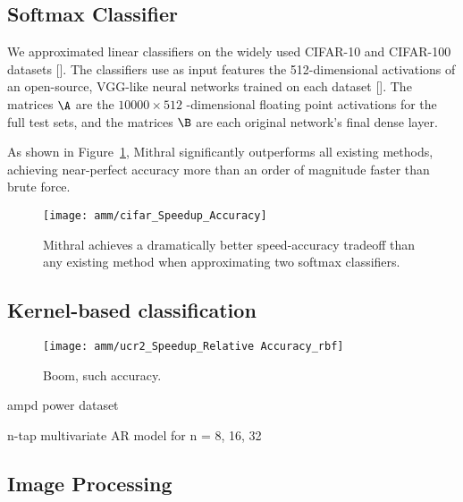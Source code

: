 \subsection{Softmax Classifier}

We approximated linear classifiers on the widely used CIFAR-10 and CIFAR-100 datasets []. The classifiers use as input features the 512-dimensional activations of an open-source, VGG-like neural networks trained on each dataset []. The matrices $\A$ are the $10000 \times 512$ -dimensional floating point activations for the full test sets, and the matrices $\B$ are each original network's final dense layer.

As shown in Figure~\ref{fig:cifar}, Mithral significantly outperforms all existing methods, achieving near-perfect accuracy more than an order of magnitude faster than brute force.

\begin{figure}[h]
\begin{center}
\texttt{[image: amm/cifar\_Speedup\_Accuracy]}
\caption{Mithral achieves a dramatically better speed-accuracy tradeoff than any existing method when approximating two softmax classifiers.}
\label{fig:cifar}
\end{center}
\end{figure}

\subsection{Kernel-based classification}

\begin{figure}[h]
\begin{center}
\texttt{[image: amm/ucr2\_Speedup\_Relative Accuracy\_rbf]}
\caption{Boom, such accuracy.}
\label{fig:ucr}
\end{center}
\end{figure}

ampd power dataset

n-tap multivariate AR model for n = 8, 16, 32

\subsection{Image Processing}

